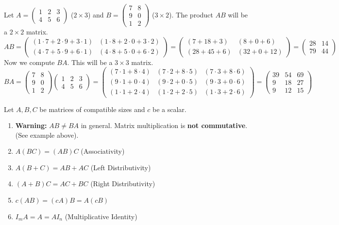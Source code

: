 \begin{example}
Let $A = \begin{pmatrix} 1 & 2 & 3 \\ 4 & 5 & 6 \end{pmatrix}$ ($2 \times 3$) and $B = \begin{pmatrix} 7 & 8 \\ 9 & 0 \\ 1 & 2 \end{pmatrix}$ ($3 \times 2$).
The product $AB$ will be a $2 \times 2$ matrix.
\[
AB = \begin{pmatrix}
(1\cdot 7 + 2\cdot 9 + 3\cdot 1) & (1\cdot 8 + 2\cdot 0 + 3\cdot 2) \\
(4\cdot 7 + 5\cdot 9 + 6\cdot 1) & (4\cdot 8 + 5\cdot 0 + 6\cdot 2)
\end{pmatrix}
= \begin{pmatrix}
(7 + 18 + 3) & (8 + 0 + 6) \\
(28 + 45 + 6) & (32 + 0 + 12)
\end{pmatrix}
= \begin{pmatrix} 28 & 14 \\ 79 & 44 \end{pmatrix}
\]
Now we compute $BA$. This will be a $3 \times 3$ matrix.
\[
BA = \begin{pmatrix} 7 & 8 \\ 9 & 0 \\ 1 & 2 \end{pmatrix} \begin{pmatrix} 1 & 2 & 3 \\ 4 & 5 & 6 \end{pmatrix}
= \begin{pmatrix}
(7\cdot 1 + 8\cdot 4) & (7\cdot 2 + 8\cdot 5) & (7\cdot 3 + 8\cdot 6) \\
(9\cdot 1 + 0\cdot 4) & (9\cdot 2 + 0\cdot 5) & (9\cdot 3 + 0\cdot 6) \\
(1\cdot 1 + 2\cdot 4) & (1\cdot 2 + 2\cdot 5) & (1\cdot 3 + 2\cdot 6)
\end{pmatrix}
= \begin{pmatrix} 39 & 54 & 69 \\ 9 & 18 & 27 \\ 9 & 12 & 15 \end{pmatrix}
\]
\end{example}

\begin{property}
Let $A, B, C$ be matrices of compatible sizes and $c$ be a scalar.
\begin{enumerate}
    \item \textbf{Warning:} $AB \neq BA$ in general. Matrix multiplication is \textbf{not commutative}. (See example above).
    \item $A(BC) = (AB)C$ (Associativity)
    \item $A(B+C) = AB + AC$ (Left Distributivity)
    \item $(A+B)C = AC + BC$ (Right Distributivity)
    \item $c(AB) = (cA)B = A(cB)$
    \item $I_m A = A = A I_n$ (Multiplicative Identity)
\end{enumerate}
\end{property}

